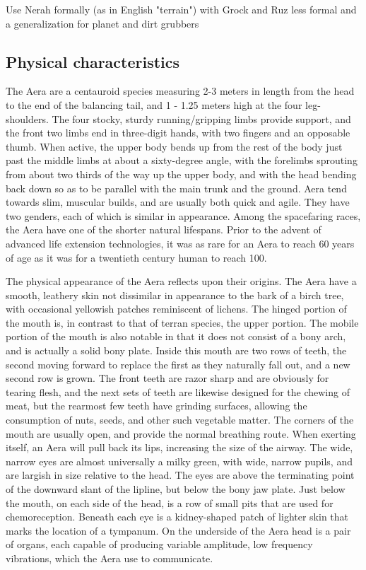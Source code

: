 Use Nerah formally (as in English "terrain") with Grock and Ruz less formal and a generalization for planet and dirt grubbers

\subsection{Physical characteristics}

The Aera are a centauroid species measuring 2-3 meters in length from
the head to the end of the balancing tail, and 1 - 1.25 meters high at
the four leg- shoulders. The four stocky, sturdy running/gripping
limbs provide support, and the front two limbs end in three-digit
hands, with two fingers and an opposable thumb. When active, the upper
body bends up from the rest of the body just past the middle limbs at
about a sixty-degree angle, with the forelimbs sprouting from about
two thirds of the way up the upper body, and with the head bending
back down so as to be parallel with the main trunk and the
ground. Aera tend towards slim, muscular builds, and are usually both
quick and agile. They have two genders, each of which is similar in
appearance. Among the spacefaring races, the Aera have one of the
shorter natural lifespans. Prior to the advent of advanced life
extension technologies, it was as rare for an Aera to reach 60 years
of age as it was for a twentieth century human to reach 100.

The physical appearance of the Aera reflects upon their origins. The
Aera have a smooth, leathery skin not dissimilar in appearance to the
bark of a birch tree, with occasional yellowish patches reminiscent of
lichens. The hinged portion of the mouth is, in contrast to that of
terran species, the upper portion. The mobile portion of the mouth is
also notable in that it does not consist of a bony arch, and is
actually a solid bony plate. Inside this mouth are two rows of teeth,
the second moving forward to replace the first as they naturally fall
out, and a new second row is grown. The front teeth are razor sharp
and are obviously for tearing flesh, and the next sets of teeth are
likewise designed for the chewing of meat, but the rearmost few teeth
have grinding surfaces, allowing the consumption of nuts, seeds, and
other such vegetable matter. The corners of the mouth are usually
open, and provide the normal breathing route. When exerting itself, an
Aera will pull back its lips, increasing the size of the airway. The
wide, narrow eyes are almost universally a milky green, with wide,
narrow pupils, and are largish in size relative to the head. The eyes
are above the terminating point of the downward slant of the lipline,
but below the bony jaw plate. Just below the mouth, on each side of
the head, is a row of small pits that are used for
chemoreception. Beneath each eye is a kidney-shaped patch of lighter
skin that marks the location of a tympanum. On the underside of the
Aera head is a pair of organs, each capable of producing variable
amplitude, low frequency vibrations, which the Aera use to
communicate.

